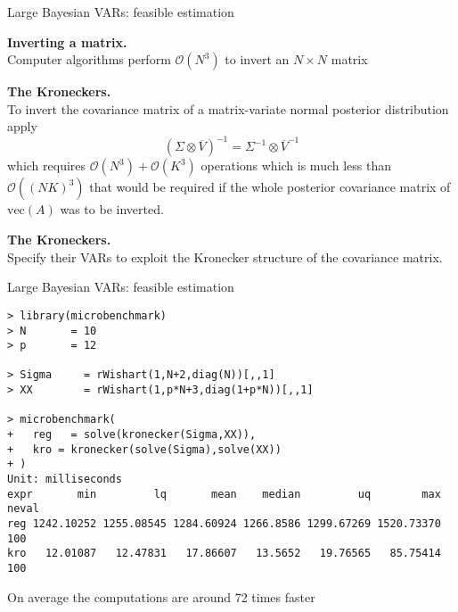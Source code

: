 \documentclass[notes,blackandwhite,mathsans,usenames,dvipsnames]{beamer}
\begin{document}
\begin{frame}{Large Bayesian VARs: feasible estimation}

\textbf{Inverting a matrix.}\\
{\color{mcxs2}Computer algorithms perform} $\mathcal{O}\left(N^3\right)$ {\color{mcxs2}to invert an} $N\times N$ {\color{mcxs2}matrix}

\bigskip\textbf{The Kroneckers.}\\
{\color{mcxs2}To invert the covariance matrix of a matrix-variate normal  posterior distribution apply} 
$$\left(\Sigma\otimes\overline{V}\right)^{-1}= \Sigma^{-1}\otimes\overline{V}^{-1}$$
{\color{mcxs2}which requires} $\mathcal{O}\left(N^3\right) + \mathcal{O}\left(K^3\right)$ {\color{mcxs2}operations which is much less than} $\mathcal{O}\left((NK)^3\right)$ {\color{mcxs2}that would be required if the whole posterior covariance matrix of} $\text{vec}(A)$ {\color{mcxs2}was to be inverted.}

\bigskip\textbf{The Kroneckers.}\\
{\color{mcxs2}Specify their VARs to exploit the Kronecker structure of the covariance matrix.}

\end{frame}



\begin{frame}[fragile]{Large Bayesian VARs: feasible estimation}

\scriptsize
\begin{verbatim}
> library(microbenchmark)
> N       = 10
> p       = 12

> Sigma     = rWishart(1,N+2,diag(N))[,,1]
> XX        = rWishart(1,p*N+3,diag(1+p*N))[,,1]

> microbenchmark(
+   reg   = solve(kronecker(Sigma,XX)),
+   kro = kronecker(solve(Sigma),solve(XX))
+ )
Unit: milliseconds
expr       min         lq       mean    median         uq        max neval
reg 1242.10252 1255.08545 1284.60924 1266.8586 1299.67269 1520.73370   100
kro   12.01087   12.47831   17.86607   13.5652   19.76565   85.75414   100
\end{verbatim}

\normalsize\bigskip
{\color{mcxs2}On average the computations are around 72 times faster}

\end{frame}
\end{document}
